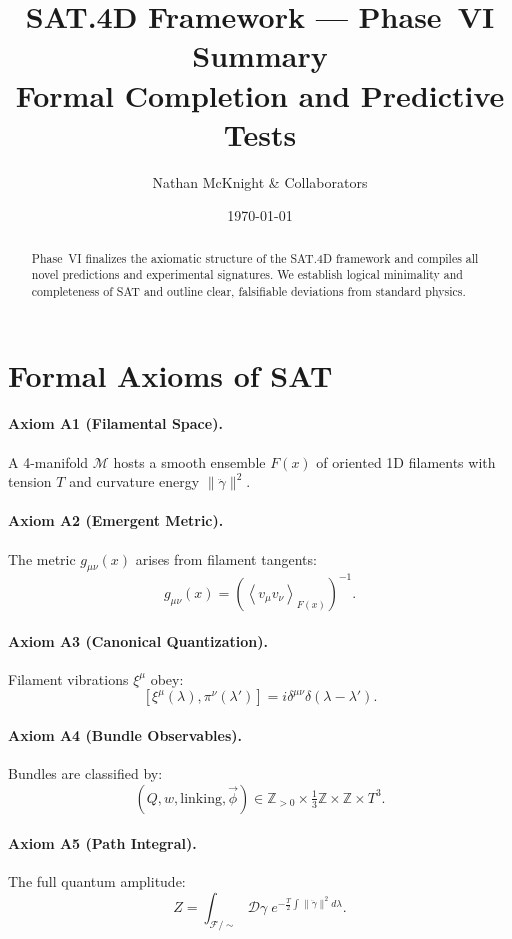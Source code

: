 \documentclass[11pt]{article}
\title{\textbf{SAT.4D Framework --- Phase~VI Summary}\\Formal Completion and Predictive Tests}
\author{Nathan McKnight \& Collaborators}
\date{\today}
\begin{document}
\maketitle

\begin{abstract}
Phase~VI finalizes the axiomatic structure of the SAT.4D framework and compiles all novel predictions and experimental signatures. We establish logical minimality and completeness of SAT and outline clear, falsifiable deviations from standard physics.
\end{abstract}

\tableofcontents

\section{Formal Axioms of SAT}

\paragraph{Axiom A1 (Filamental Space).}
A 4-manifold \( \mathcal{M} \) hosts a smooth ensemble \( F(x) \) of oriented 1D filaments with tension \( T \) and curvature energy \( \|\ddot\gamma\|^2 \).

\paragraph{Axiom A2 (Emergent Metric).}
The metric \( g_{\mu\nu}(x) \) arises from filament tangents:
\[
g_{\mu\nu}(x) = \left( \left\langle v_\mu v_\nu \right\rangle_{F(x)} \right)^{-1}.
\]

\paragraph{Axiom A3 (Canonical Quantization).}
Filament vibrations \( \xi^\mu \) obey:
\[
[\xi^\mu(\lambda), \pi^\nu(\lambda')] = i \delta^{\mu\nu} \delta(\lambda - \lambda').
\]

\paragraph{Axiom A4 (Bundle Observables).}
Bundles are classified by:
\[
(Q, w, \text{linking}, \vec{\phi}) \in \mathbb{Z}_{>0} \times \tfrac{1}{3}\mathbb{Z} \times \mathbb{Z} \times T^3.
\]

\paragraph{Axiom A5 (Path Integral).}
The full quantum amplitude:
\[
Z = \int_{\mathcal{F}/\sim} \mathcal{D}\gamma\; e^{-\tfrac{T}{2} \int \|\ddot\gamma\|^2 d\lambda}.
\]
\end{document}
